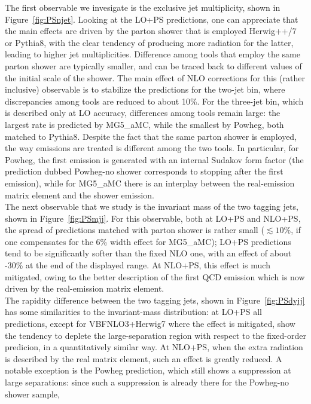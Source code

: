 The first observable we invesigate is the exclusive jet multiplicity, shown in Figure~\ref{fig:PSnjet}. Looking at the LO+PS predictions, one can appreciate that the
main effects are driven by the parton shower that is employed {\sc Herwig++/7} or {\sc Pythia8}, with the clear tendency of producing more radiation for the latter, 
leading to higher jet multiplicities. Difference among tools that employ the same parton shower are typically smaller, and can be traced back to different values of the
initial scale of the shower. The main effect of NLO corrections for this (rather inclusive) observable is to stabilize the predictions for the two-jet bin, where discrepancies 
among tools are reduced to about 10\%. For the three-jet bin, which is described only at LO accuracy, differences among tools remain large: the largest rate is predicted by
{\sc MG5\_aMC}, while the smallest by {\sc Powheg}, both matched to {\sc Pythia8}. Despite the fact that the same parton shower is employed, the way emissions are treated
is different among the two tools. In particular, for {\sc Powheg}, the first emission is generated with an internal Sudakov form factor (the
prediction dubbed {\sc Powheg-no shower} corresponds to stopping after the first emission), while for {\sc MG5\_aMC} there is an
interplay between the real-emission matrix element and the shower emission. \\
The next observable that we study is the invariant mass of the two tagging jets, shown in Figure~\ref{fig:PSmjj}. For this observable, both at LO+PS and NLO+PS,
the spread of predictions matched with parton shower is rather small
($\lesssim 10\%$, if one compensates for the 6\% width effect for {\sc MG5\_aMC}); LO+PS predictions tend to be significantly softer than the fixed NLO one, with an effect of 
about -30\% at the end of the displayed range. At NLO+PS, this effect is much mitigated, owing to the better description of the first QCD emission which is now driven by  
 the real-emission matrix element.\\
The rapidity difference between the two tagging jets, shown in Figure~\ref{fig:PSdyjj} has some similarities to the invariant-mass distribution: at LO+PS all predictions, 
except for {\sc VBFNLO3+Herwig7} where the effect is mitigated, show the tendency to deplete the large-separation region with respect to the fixed-order predicion, in a 
quantitatively similar way. At NLO+PS, when the extra radiation is described by the real matrix element, such an effect is greatly reduced. A notable 
exception is the {\sc Powheg} prediction, which still shows a suppression at large separations: since such a suppression is already there for the {\sc Powheg-no shower} sample,
